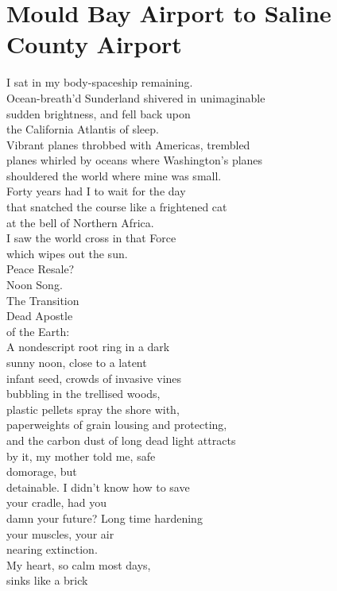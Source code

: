 \documentclass[smalldemyvopaper,11pt,twoside,onecolumn,openright,extrafontsizes]{memoir}
\begin{document}
\chapter{Mould Bay Airport to Saline County Airport}
I sat in my body-spaceship remaining.
\\Ocean-breath'd Sunderland shivered in unimaginable
\\sudden brightness, and fell back upon
\\the California Atlantis of sleep.
\\Vibrant planes throbbed with Americas, trembled
\\planes whirled by oceans where Washington's planes
\\shouldered the world where mine was small.
\\Forty years had I to wait for the day
\\that snatched the course like a frightened cat
\\at the bell of Northern Africa.
\\I saw the world cross in that Force
\\which wipes out the sun.
\\Peace Resale?
\\Noon Song.
\\The Transition
\\Dead Apostle
\\of the Earth:
\\A nondescript root ring in a dark
\\sunny noon, close to a latent
\\infant seed, crowds of invasive vines
\\bubbling in the trellised woods,
\\plastic pellets spray the shore with,
\\paperweights of grain lousing and protecting,
\\and the carbon dust of long dead light attracts
\\by it, my mother told me, safe
\\domorage, but
\\detainable. I didn't know how to save
\\your cradle, had you
\\damn your future? Long time hardening
\\your muscles, your air
\\nearing extinction.
\\My heart, so calm most days,
\\sinks like a brick
\end{document}
